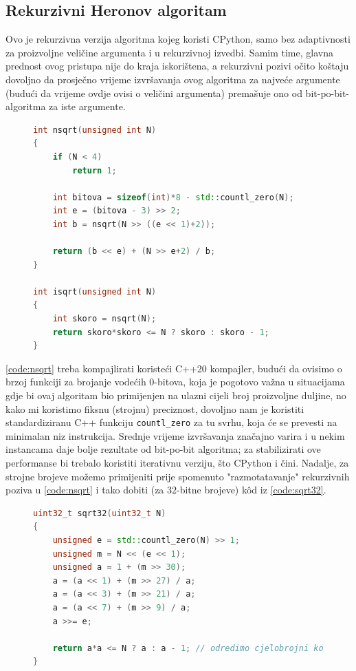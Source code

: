 \documentclass[12pt]{scrartcl}
\begin{document}
\subsection{Rekurzivni Heronov algoritam}
Ovo je rekurzivna verzija algoritma kojeg koristi CPython, samo bez adaptivnosti za proizvoljne veličine argumenta i u rekurzivnoj izvedbi.
Samim time, glavna prednost ovog pristupa nije do kraja iskorištena, a rekurzivni pozivi očito koštaju dovoljno da prosječno vrijeme izvršavanja
ovog algoritma za najveće argumente (budući da vrijeme ovdje ovisi o veličini argumenta) premašuje ono od bit-po-bit-algoritma za iste argumente.
\begin{figure}[h]
\begin{lstlisting}[language=C++, label=code:nsqrt, caption=Rekurzivna Heronova metoda u C++20]
int nsqrt(unsigned int N)
{
    if (N < 4)
        return 1;

    int bitova = sizeof(int)*8 - std::countl_zero(N);
    int e = (bitova - 3) >> 2;
    int b = nsqrt(N >> ((e << 1)+2));

    return (b << e) + (N >> e+2) / b;
}

int isqrt(unsigned int N)
{
    int skoro = nsqrt(N);
    return skoro*skoro <= N ? skoro : skoro - 1;
}
\end{lstlisting}
\end{figure}
\autoref{code:nsqrt} treba kompajlirati koristeći C++20 kompajler, budući da ovisimo o brzoj funkciji za brojanje vodećih $0$-bitova, koja je pogotovo
važna u situacijama gdje bi ovaj algoritam bio primijenjen na ulazni cijeli broj proizvoljne duljine, no kako mi koristimo fiksnu (strojnu) preciznost,
dovoljno nam je koristiti standardiziranu C++ funkciju \texttt{countl\_zero} za tu svrhu, koja će se prevesti na minimalan niz instrukcija.
Srednje vrijeme izvršavanja značajno varira i u nekim instancama daje bolje rezultate od bit-po-bit
algoritma; za stabilizirati ove performanse bi trebalo koristiti iterativnu verziju, što CPython i čini. Nadalje, za strojne brojeve možemo
primijeniti prije spomenuto "razmotatavanje" rekurzivnih poziva
u \autoref{code:nsqrt} i tako dobiti (za $32$-bitne brojeve) k\^od iz \autoref{code:sqrt32}.
\begin{figure}[h]
\begin{lstlisting}[language=C++, label=code:sqrt32, caption=Algoritam za $32$-bitne argumente u C++20~\cite{mdickpaper}]
uint32_t sqrt32(uint32_t N)
{
    unsigned e = std::countl_zero(N) >> 1;
    unsigned m = N << (e << 1);
    unsigned a = 1 + (m >> 30);
    a = (a << 1) + (m >> 27) / a;
    a = (a << 3) + (m >> 21) / a;
    a = (a << 7) + (m >> 9) / a;
    a >>= e;

    return a*a <= N ? a : a - 1; // odredimo cjelobrojni korijen iz skoro-korijena
}
\end{lstlisting}
\end{figure}
\end{document}
